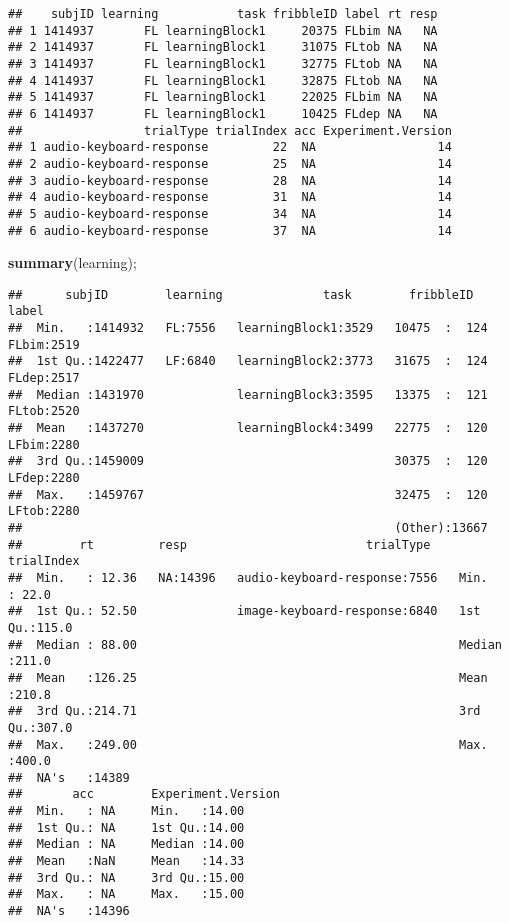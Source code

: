 \documentclass[
]{article}
\newenvironment{Shaded}{\begin{snugshade}}{\end{snugshade}}
\newcommand{\KeywordTok}[1]{\textcolor[rgb]{0.13,0.29,0.53}{\textbf{#1}}}
\newcommand{\NormalTok}[1]{#1}
\begin{document}
\begin{verbatim}
##    subjID learning           task fribbleID label rt resp
## 1 1414937       FL learningBlock1     20375 FLbim NA   NA
## 2 1414937       FL learningBlock1     31075 FLtob NA   NA
## 3 1414937       FL learningBlock1     32775 FLtob NA   NA
## 4 1414937       FL learningBlock1     32875 FLtob NA   NA
## 5 1414937       FL learningBlock1     22025 FLbim NA   NA
## 6 1414937       FL learningBlock1     10425 FLdep NA   NA
##                 trialType trialIndex acc Experiment.Version
## 1 audio-keyboard-response         22  NA                 14
## 2 audio-keyboard-response         25  NA                 14
## 3 audio-keyboard-response         28  NA                 14
## 4 audio-keyboard-response         31  NA                 14
## 5 audio-keyboard-response         34  NA                 14
## 6 audio-keyboard-response         37  NA                 14
\end{verbatim}

\begin{Shaded}
\begin{Highlighting}[]
\KeywordTok{summary}\NormalTok{(learning);}
\end{Highlighting}
\end{Shaded}

\begin{verbatim}
##      subjID        learning              task        fribbleID       label     
##  Min.   :1414932   FL:7556   learningBlock1:3529   10475  :  124   FLbim:2519  
##  1st Qu.:1422477   LF:6840   learningBlock2:3773   31675  :  124   FLdep:2517  
##  Median :1431970             learningBlock3:3595   13375  :  121   FLtob:2520  
##  Mean   :1437270             learningBlock4:3499   22775  :  120   LFbim:2280  
##  3rd Qu.:1459009                                   30375  :  120   LFdep:2280  
##  Max.   :1459767                                   32475  :  120   LFtob:2280  
##                                                    (Other):13667               
##        rt         resp                         trialType      trialIndex   
##  Min.   : 12.36   NA:14396   audio-keyboard-response:7556   Min.   : 22.0  
##  1st Qu.: 52.50              image-keyboard-response:6840   1st Qu.:115.0  
##  Median : 88.00                                             Median :211.0  
##  Mean   :126.25                                             Mean   :210.8  
##  3rd Qu.:214.71                                             3rd Qu.:307.0  
##  Max.   :249.00                                             Max.   :400.0  
##  NA's   :14389                                                             
##       acc        Experiment.Version
##  Min.   : NA     Min.   :14.00     
##  1st Qu.: NA     1st Qu.:14.00     
##  Median : NA     Median :14.00     
##  Mean   :NaN     Mean   :14.33     
##  3rd Qu.: NA     3rd Qu.:15.00     
##  Max.   : NA     Max.   :15.00     
##  NA's   :14396
\end{verbatim}
\end{document}
